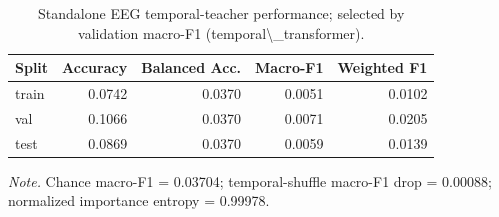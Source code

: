 \begin{table}[t]
\centering
\caption{Standalone EEG temporal-teacher performance; selected by validation macro-F1 (temporal\textbackslash{}_transformer).}
\label{tab:eeg_teacher}
\begin{tabular}{lrrrr}
\toprule
Split & Accuracy & Balanced Acc. & Macro-F1 & Weighted F1 \\
\midrule
train & 0.0742 & 0.0370 & 0.0051 & 0.0102 \\
val & 0.1066 & 0.0370 & 0.0071 & 0.0205 \\
test & 0.0869 & 0.0370 & 0.0059 & 0.0139 \\
\bottomrule
\end{tabular}
\par\smallskip\noindent\footnotesize\textit{Note.} Chance macro-F1 = 0.03704; temporal-shuffle macro-F1 drop = 0.00088; normalized importance entropy = 0.99978.
\end{table}
